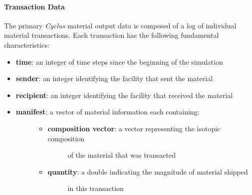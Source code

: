 \documentclass[letterpaper,10pt,english]{sphinxmanual}
\begin{document}
\paragraph{Transaction Data}
\label{devdoc/output_usecases:transaction-data}
The primary \emph{Cyclus} material output data is composed of a log of individual
material transactions.  Each transaction has the following fundamental characteristics:
\begin{itemize}
\item {} 
\textbf{time}: an integer of time steps since the beginning of the simulation

\item {} 
\textbf{sender}: an integer identifying the facility that sent the material

\item {} 
\textbf{recipient}: an integer identifying the facility that received the material

\item {} \begin{description}
\item[{\textbf{manifest}: a vector of material information each containing:}] \leavevmode\begin{itemize}
\item {} \begin{description}
\item[{\textbf{composition vector}: a vector representing the isotopic composition}] \leavevmode
of the material that was transacted

\end{description}

\item {} \begin{description}
\item[{\textbf{quantity}: a double indicating the magnitude of material shipped}] \leavevmode
in this transaction

\end{description}

\end{itemize}

\end{description}

\end{itemize}
\end{document}
